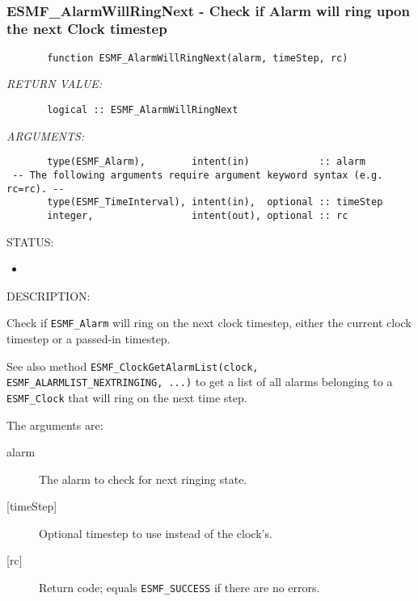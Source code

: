\mbox{}\hrulefill\ 
 
\subsubsection [ESMF\_AlarmWillRingNext] {ESMF\_AlarmWillRingNext - Check if Alarm will ring upon the next Clock timestep}


 
\begin{verbatim}       function ESMF_AlarmWillRingNext(alarm, timeStep, rc)\end{verbatim}{\em RETURN VALUE:}
\begin{verbatim}       logical :: ESMF_AlarmWillRingNext
 \end{verbatim}{\em ARGUMENTS:}
\begin{verbatim}       type(ESMF_Alarm),        intent(in)            :: alarm
 -- The following arguments require argument keyword syntax (e.g. rc=rc). --
       type(ESMF_TimeInterval), intent(in),  optional :: timeStep
       integer,                 intent(out), optional :: rc
 \end{verbatim}
{\sf STATUS:}
   \begin{itemize}
   \item{}
   \end{itemize}
  
{\sf DESCRIPTION:\\ }


       Check if {\tt ESMF\_Alarm} will ring on the next clock timestep, either
       the current clock timestep or a passed-in timestep.
  
       See also method
         {\tt ESMF\_ClockGetAlarmList(clock, ESMF\_ALARMLIST\_NEXTRINGING, ...)}
       to get a list of all alarms belonging to a {\tt ESMF\_Clock} that will
       ring on the next time step.
  
       The arguments are:
       \begin{description}
       \item[alarm]
            The alarm to check for next ringing state.
       \item[{[timeStep]}]
            Optional timestep to use instead of the clock's.
       \item[{[rc]}]
            Return code; equals {\tt ESMF\_SUCCESS} if there are no errors.
       \end{description}
\setlength{\parskip}{\oldparskip}
\setlength{\parindent}{\oldparindent}
\setlength{\baselineskip}{\oldbaselineskip}
